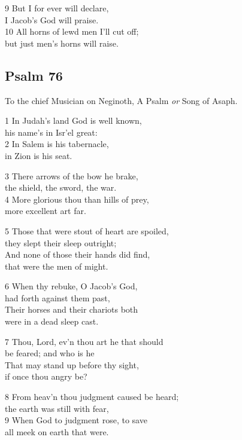 9 But I for ever will declare,\\
I Jacob’s God will praise.\\
10 All horns of lewd men I’ll cut off;\\
but just men’s horns will raise.

\begin{center}
\quad{}\quad{}
\end{center}


\subsection*{Psalm 76}

To the chief Musician on Neginoth,
A Psalm \emph{or} Song of Asaph.

1 In Judah’s land God is well known,\\
his name’s in Isr’el great:\\
2 In Salem is his tabernacle,\\
in Zion is his seat.

3 There arrows of the bow he brake,\\
the shield, the sword, the war.\\
4 More glorious thou than hills of prey,\\
more excellent art far.

5 Those that were stout of heart are spoiled,\\
they slept their sleep outright;\\
And none of those their hands did find,\\
that were the men of might.

6 When thy rebuke, O Jacob’s God,\\
had forth against them past,\\
Their horses and their chariots both\\
were in a dead sleep cast.

7 Thou, Lord, ev’n thou art he that should\\
be feared; and who is he\\
That may stand up before thy sight,\\
if once thou angry be?

8 From heav’n thou judgment caused be heard;\\
the earth was still with fear,\\
9 When God to judgment rose, to save\\
all meek on earth that were.

